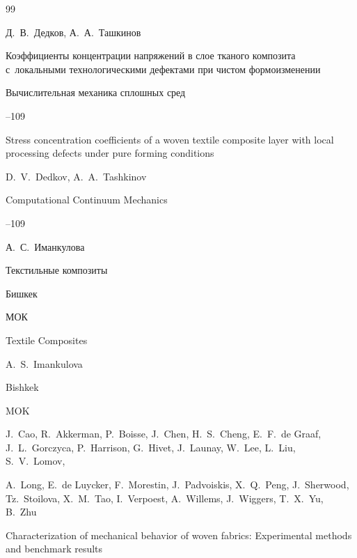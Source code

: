\begin{thebibliography}{99}

\by Д.~В.~Дедков, А.~А.~Ташкинов

\paper Коэффициенты концентрации напряжений в слое тканого композита с~локальными технологическими дефектами при чистом формоизменении

\jour Вычислительная механика сплошных сред



--109


\misctransl

\paper Stress concentration coefficients of a woven textile composite layer with local processing defects under pure forming conditions 

\by D.~V.~Dedkov, A.~A.~Tashkinov

\jour Computational Continuum Mechanics



--109




 \by А.~С.~Иманкулова

 \book Текстильные композиты

 \publaddr Бишкек

 \publ МОК



\misctransl

\book Textile Composites

\by A.~S.~Imankulova 

\publaddr Bishkek 

\publ MOK 






 \by J.~Cao, R.~Akkerman, P.~Boisse,  J.~Chen,  H.~S.~Cheng, E.~F.~de Graaf, J.~L.~Gorczyca, P.~Harrison, G.~Hivet, J.~Launay, W.~Lee, L.~Liu, S.~V.~Lomov, 

A.~Long,  E.~de Luycker, F.~Morestin, J.~Padvoiskis, X.~Q.~Peng, J.~Sherwood, Tz.~Stoilova, X.~M.~Tao, I.~Verpoest, A.~Willems, J.~Wiggers, T.~X.~Yu,  B.~Zhu

 \paper Characterization of mechanical behavior of woven fabrics: Experimental methods and benchmark results


\end{thebibliography}
